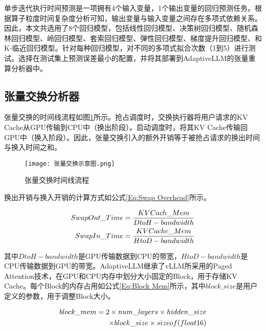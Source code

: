 单步迭代执行时间预测是一项拥有4个输入变量，1个输出变量的回归预测任务。根据算子粒度时间复杂度分析可知，输出变量与输入变量之间存在多项式依赖关系。因此，本文共选用了8个回归模型，包括线性回归模型、决策树回归模型、随机森林回归模型、岭回归模型、套索回归模型、弹性回归模型、梯度提升回归模型、和K-临近回归模型。针对每种回归模型，对不同的多项式拟合次数（1到5）进行测试。选择在测试集上预测误差最小的配置，并将其部署到AdaptiveLLM的张量重算分析器中。 

\subsection{张量交换分析器}

张量交换的时间线流程如图\ref{Fig:张量交换示意图}所示。抢占调度时，交换执行器将用户请求的KV Cache从GPU传输到CPU中（换出阶段）。启动调度时，将其KV Cache传输回GPU中（换入阶段）。因此，张量交换引入的额外开销等于被抢占请求的换出时间与换入时间之和。

\begin{figure}[!htbp]
  \centering
  \texttt{[image: 张量交换示意图.png]}
  \caption{张量交换时间线流程}
  \label{Fig:张量交换示意图}
\end{figure}

换出开销与换入开销的计算方式如公式\ref{Eq:Swap Overhead}所示。

\begin{equation}
  \begin{aligned}
    SwapOut\_Time=\frac{KVCach\_Mem}{DtoH-bandwidth} \\
    SwapIn\_Time=\frac{KVCache\_Mem}{HtoD-bandwidth}
  \end{aligned}
  \label{Eq:Swap Overhead}
  \setlength{\abovedisplayskip}{0ex}
  \setlength{\belowdisplayskip}{2ex}
\end{equation}

其中$DtoH-bandwidth$是GPU传输数据到CPU的带宽，$HtoD-bandwidth$是CPU传输数据到GPU的带宽。AdaptiveLLM继承了vLLM所采用的Paged Attention技术，在GPU和CPU内存中划分大小固定的Block，用于存储KV Cache。每个Block的内存占用如公式\ref{Eq:Block Mem}所示，其中$block\_size$是用户定义的参数，用于调整Block大小。

\begin{equation}
  \begin{aligned}
    block\_mem = 2 \times num\_layers \times hidden\_size \\ 
    \times block\_size \times sizeof(float16)
  \end{aligned}
  \label{Eq:Block Mem}
  \setlength{\abovedisplayskip}{0ex}
  \setlength{\belowdisplayskip}{2ex}
\end{equation}

